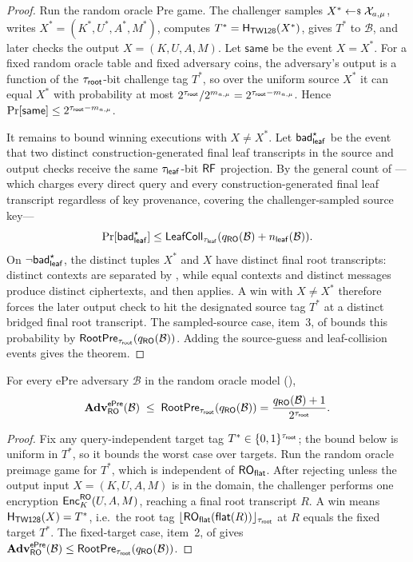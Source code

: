 \begin{proof}
Run the random oracle Pre game. The challenger samples
$X^* \sample \mathcal{X}_{a,\mu}$, writes
$X^*=(K^*,U^*,A^*,M^*)$, computes $T^*=\mathsf{H}_{\mathsf{TW128}}(X^*)$, gives $T^*$ to
$\mathcal{B}$, and later checks the output $X=(K,U,A,M)$. Let
$\mathsf{same}$ be the event $X=X^*$. For a
fixed random oracle table and fixed adversary coins, the adversary's output
is a function of the $\tau_{\mathsf{root}}$-bit challenge tag $T^*$, so over the
uniform source $X^*$ it can equal $X^*$ with probability at most
$2^{\tau_{\mathsf{root}}}/2^{m_{a,\mu}}=2^{\tau_{\mathsf{root}}-m_{a,\mu}}$. Hence
$\Pr[\mathsf{same}] \leq 2^{\tau_{\mathsf{root}}-m_{a,\mu}}$.

It remains to bound winning executions with $X \neq X^*$. Let
$\mathsf{bad}_{\mathsf{leaf}}^\star$ be the event that two distinct construction-generated
final leaf transcripts in the source and output checks receive the same
$\tau_{\mathsf{leaf}}$-bit $\mathsf{RF}$ projection. By the general count of
---which charges every direct query and every
construction-generated final leaf transcript regardless of key
provenance, covering the challenger-sampled source key---
\[
  \Pr[\mathsf{bad}_{\mathsf{leaf}}^\star]
  \leq
  \mathsf{LeafColl}_{\tau_{\mathsf{leaf}}}(q_{\mathsf{RO}}(\mathcal{B})+n_{\mathsf{leaf}}(\mathcal{B})).
\]
On $\neg\mathsf{bad}_{\mathsf{leaf}}^\star$, the distinct tuples $X^*$ and $X$ have distinct
final root transcripts: distinct contexts are separated by
, while equal contexts and distinct messages produce
distinct ciphertexts, and then  applies. A win
with $X \neq X^*$ therefore forces the later output check to hit the
designated source tag $T^*$ at a distinct bridged final root transcript.
The sampled-source case, item~3, of  bounds this
probability by $\mathsf{RootPre}_{\tau_{\mathsf{root}}}(q_{\mathsf{RO}}(\mathcal{B}))$. Adding the
source-guess and leaf-collision events gives the theorem.
\end{proof}

\begin{theorem}
\label{thm:epre-ro}
For every ePre adversary $\mathcal{B}$ in the \TW{}
random oracle model (),
\[
  \mathbf{Adv}^{\mathsf{ePre}}_{\mathsf{RO}}(\mathcal{B})
  \;\leq\; \mathsf{RootPre}_{\tau_{\mathsf{root}}}(q_{\mathsf{RO}}(\mathcal{B}))
  = \frac{q_{\mathsf{RO}}(\mathcal{B}) + 1}{2^{\tau_{\mathsf{root}}}}.
\]
\end{theorem}

\begin{proof}
Fix any query-independent target tag $T^* \in \{0,1\}^{\tau_{\mathsf{root}}}$; the
bound below is uniform in $T^*$, so it bounds the worst case over
targets. Run the random oracle preimage game for $T^*$, which is
independent of $\mathsf{RO}_{\mathsf{flat}}$. After rejecting unless the
output input $X = (K, U, A, M)$ is in the \TW{} domain, the challenger
performs one encryption $\mathsf{Enc}_{K}^{\mathsf{RO}}(U, A, M)$, reaching a final root
transcript $R$. A win means $\mathsf{H}_{\mathsf{TW128}}(X) = T^*$, i.e.\ the root tag
$\lfloor \mathsf{RO}_{\mathsf{flat}}(\mathsf{flat}(R)) \rfloor_{\tau_{\mathsf{root}}}$ at $R$ equals the fixed
target $T^*$. The fixed-target case, item~2, of
 gives
$\mathbf{Adv}^{\mathsf{ePre}}_{\mathsf{RO}}(\mathcal{B}) \leq \mathsf{RootPre}_{\tau_{\mathsf{root}}}(q_{\mathsf{RO}}(\mathcal{B}))$.
\end{proof}

